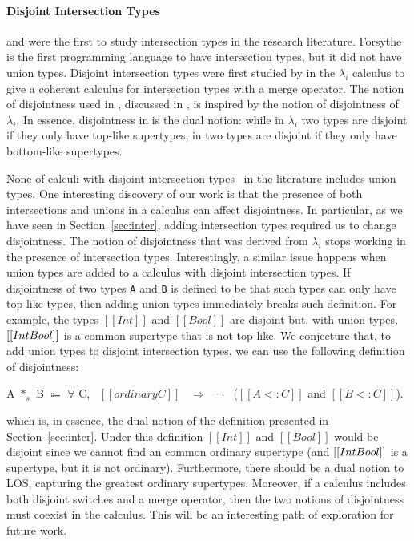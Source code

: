 \paragraph{Disjoint Intersection Types}
\citet{pottinger1980type} and \citet{coppo1981functional} were the first to study
intersection types in the research
literature. Forsythe~\cite{reynolds1988preliminary} is the first
programming language to have intersection types, but it did not
have union types.  Disjoint intersection types were first
studied by \citet{oliveira2016disjoint} in the $\lambda_{i}$ calculus
to give a coherent calculus for intersection types with a merge
operator. The notion of disjointness used in \cal, discussed in ,
is inspired by the notion of disjointness of $\lambda_{i}$. In essence,
disjointness in \cal is the dual notion: while in $\lambda_{i}$ two types
are disjoint if they only have top-like supertypes, in \cal two types
are disjoint if they only have bottom-like supertypes.

None of calculi with disjoint intersection types~\cite{oliveira2016disjoint,bi_et_al:LIPIcs:2018:9227,alpuimdisjoint,Huang:typedirected} in the literature
includes union types. One interesting discovery of our work is that the
presence of both intersections and unions in a calculus can affect disjointness.
In particular, as we have seen in Section~\ref{sec:inter}, adding intersection types
required us to change disjointness. The notion of disjointness that was
derived from $\lambda_{i}$ stops working in the presence of intersection types.
Interestingly, a similar issue happens when union types are added to
a calculus with disjoint intersection types. If disjointness of two types \lstinline{A}
and \lstinline{B} is defined to be that such types can only have top-like types,
then adding union types immediately breaks such definition.
For example, the types $[[Int]]$ and $[[Bool]]$ are disjoint but, with union
types, $[[Int \/ Bool]]$ is a common supertype that is not top-like.
We conjecture that, to add union types to disjoint intersection types,
we can use the following definition of disjointness:

\begin{definition}
\label{def:related:disj}
  A $*_s$ B $\Coloneqq$ $\forall$ C, \ $[[ordinary C]]$ \ $\Longrightarrow$ \ $\neg$ \ ($[[A <: C]]$ and $[[B <: C]]$).
\end{definition}

\noindent which is, in essence, the dual notion of the definition presented in
Section~\ref{sec:inter}. Under this definition $[[Int]]$ and $[[Bool]]$ would
be disjoint since we cannot find an common ordinary supertype (and $[[Int \/ Bool]]$
is a supertype, but it is not ordinary). Furthermore, there should be a
dual notion to LOS, capturing the greatest ordinary supertypes. Moreover,
if a calculus includes both disjoint switches and a merge operator,
then the two notions of disjointness must coexist in the calculus.
This will be an interesting path of exploration for future work.

